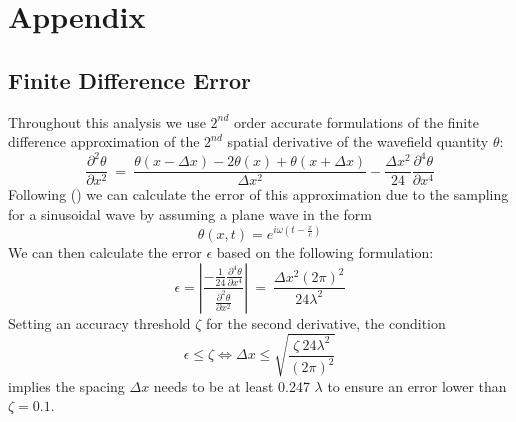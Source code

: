 \documentclass[]{article}
\begin{document}
	\newpage
	
	\singlespacing
	\begin{multicols}{2}[\printbibheading]
	\printbibliography[heading=none]
	\end{multicols}

	\doublespacing
	\newpage
	\appendix

	\section*{Appendix} 
	\renewcommand{\thesubsection}{\Alph{subsection}}
	\subsection{Finite Difference Error}\label{sec:Appendix}
	\renewcommand{\theequation}{A\thesection\arabic{equation}}
	\setcounter{equation}{0}
	\renewcommand{\thefigure}{A\arabic{figure}}
	\setcounter{figure}{0} 
	
	Throughout this analysis we use $2^{nd}$ order accurate formulations of the finite difference approximation of the $2^{nd}$ spatial derivative of the wavefield quantity $\theta$:
	\begin{equation}
		\frac{\partial^{2} \theta}{\partial x^{2}} \: = \: \frac{\theta(x-\Delta x) - 2 \theta(x) + \theta(x+ \Delta x)}{\Delta x^{2}} -  \frac{\Delta x^{2}}{24} \frac{\partial^{4} \theta}{\partial x^{4}}
	\end{equation}
	Following (\cite{Langston1}) we can calculate the error of this approximation due to the sampling for a sinusoidal wave by assuming a plane wave in the form
	\begin{equation}
		\theta(x,t) = e^{i \omega (t-\frac{x}{c})}
	\end{equation}
	We can then calculate the error $\epsilon$ based on the following formulation:
	\begin{equation}
		\epsilon = \left| \frac{-\frac{1}{24} \frac{\partial^{4} \theta}{\partial x^{4}}}{\frac{\partial^{2} \theta}{\partial x^{2}}} \right| \: = \: \frac{\Delta x^{2} (2 \pi)^{2}}{24 \lambda^{2}}
	\end{equation}
	Setting an accuracy threshold $\zeta$ for the second derivative, the condition
	\begin{equation}
		\epsilon \le \zeta \Leftrightarrow \Delta x \le \sqrt{\frac{\zeta \: 24 \lambda^{2}}{(2 \pi)^{2}}}
	\end{equation}
	implies the spacing $\Delta x$ needs to be at least 0.247 $\lambda$ to ensure an error lower than $\zeta=0.1$.
	
\end{document}
